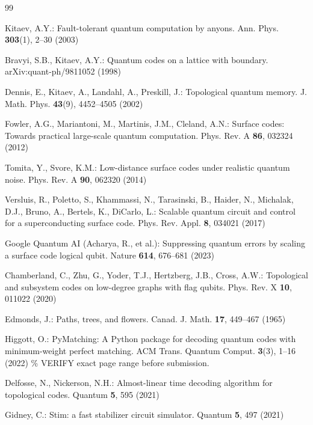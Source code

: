 \documentclass[pdflatex,sn-mathphys,Numbered]{sn-jnl}
\begin{document}
\begin{thebibliography}{99}

 Kitaev, A.Y.: Fault-tolerant quantum computation by anyons. Ann. Phys. \textbf{303}(1), 2--30 (2003)

 Bravyi, S.B., Kitaev, A.Y.: Quantum codes on a lattice with boundary. arXiv:quant-ph/9811052 (1998)

 Dennis, E., Kitaev, A., Landahl, A., Preskill, J.: Topological quantum memory. J. Math. Phys. \textbf{43}(9), 4452--4505 (2002)

 Fowler, A.G., Mariantoni, M., Martinis, J.M., Cleland, A.N.: Surface codes: Towards practical large-scale quantum computation. Phys. Rev. A \textbf{86}, 032324 (2012)

 Tomita, Y., Svore, K.M.: Low-distance surface codes under realistic quantum noise. Phys. Rev. A \textbf{90}, 062320 (2014)

 Versluis, R., Poletto, S., Khammassi, N., Tarasinski, B., Haider, N., Michalak, D.J., Bruno, A., Bertels, K., DiCarlo, L.: Scalable quantum circuit and control for a superconducting surface code. Phys. Rev. Appl. \textbf{8}, 034021 (2017)

 Google Quantum AI (Acharya, R., et al.): Suppressing quantum errors by scaling a surface code logical qubit. Nature \textbf{614}, 676--681 (2023)

 Chamberland, C., Zhu, G., Yoder, T.J., Hertzberg, J.B., Cross, A.W.: Topological and subsystem codes on low-degree graphs with flag qubits. Phys. Rev. X \textbf{10}, 011022 (2020)

 Edmonds, J.: Paths, trees, and flowers. Canad. J. Math. \textbf{17}, 449--467 (1965)

 Higgott, O.: PyMatching: A Python package for decoding quantum codes with minimum-weight perfect matching. ACM Trans. Quantum Comput. \textbf{3}(3), 1--16 (2022) \% VERIFY exact page range before submission.

 Delfosse, N., Nickerson, N.H.: Almost-linear time decoding algorithm for topological codes. Quantum \textbf{5}, 595 (2021)

 Gidney, C.: Stim: a fast stabilizer circuit simulator. Quantum \textbf{5}, 497 (2021)


\end{thebibliography}
\end{document}
